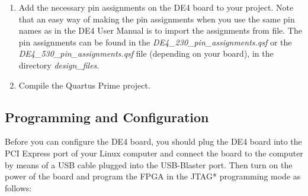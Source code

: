 \documentclass[11pt, twoside, pdftex]{article}
\begin{document}
\begin{enumerate}
	\item Add the necessary pin assignments on the DE4 board to your project. Note that an easy way of making the pin assignments when you use the same pin names as in the DE4 User Manual is to import the assignments from file. The pin assignments can be found in the {\it DE4\_230\_pin\_assignments.qsf} or the {\it DE4\_530\_pin\_assignments.qsf} file (depending on your board), in the directory {\it design\_files}.
	\item Compile the Quartus Prime project.
\end{enumerate}

\subsection{Programming and Configuration}
\label{section:Programming and Configuration}
Before you can configure the DE4 board, you should plug the DE4 board into the PCI Express port of your Linux computer and connect the board to the computer by means of a USB cable plugged into the USB-Blaster port. Then turn on the power of the board and program the FPGA in the JTAG* programming mode as follows:
\end{document}
